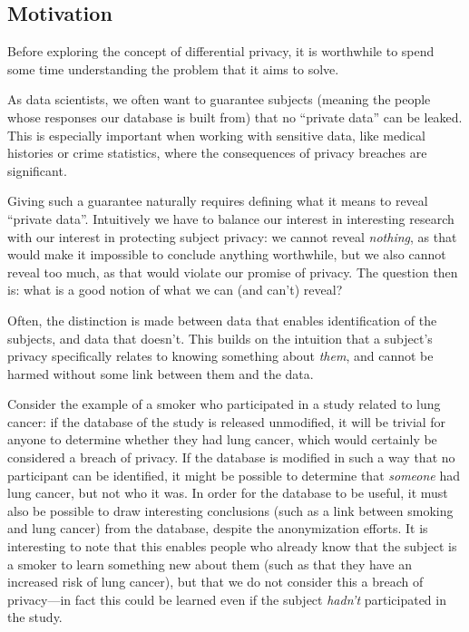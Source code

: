 \documentclass[a4paper,12pt]{article}
\begin{document}
\subsection{Motivation \label{sec:motivation}}

Before exploring the concept of differential privacy, it is worthwhile to spend some time understanding the problem that it aims to solve.

As data scientists, we often want to guarantee subjects (meaning the people whose responses our database is built from) that no ``private data'' can be leaked. This is especially important when working with sensitive data, like medical histories or crime statistics, where the consequences of privacy breaches are significant.

Giving such a guarantee naturally requires defining what it means to reveal ``private data''. Intuitively we have to balance our interest in interesting research with our interest in protecting subject privacy: we cannot reveal \emph{nothing}, as that would make it impossible to conclude anything worthwhile, but we also cannot reveal too much, as that would violate our promise of privacy. The question then is: what is a good notion of what we can (and can't) reveal?

Often, the distinction is made between data that enables identification of the subjects, and data that doesn't. This builds on the intuition that a subject's privacy specifically relates to knowing something about \emph{them}, and cannot be harmed without some link between them and the data.

Consider the example of a smoker who participated in a study related to lung cancer: if the database of the study is released unmodified, it will be trivial for anyone to determine whether they had lung cancer, which would certainly be considered a breach of privacy. If the database is modified in such a way that no participant can be identified, it might be possible to determine that \emph{someone} had lung cancer, but not who it was. In order for the database to be useful, it must also be possible to draw interesting conclusions (such as a link between smoking and lung cancer) from the database, despite the anonymization efforts. It is interesting to note that this enables people who already know that the subject is a smoker to learn something new about them (such as that they have an increased risk of lung cancer), but that we do not consider this a breach of privacy---in fact this could be learned even if the subject \emph{hadn't} participated in the study.
\end{document}

